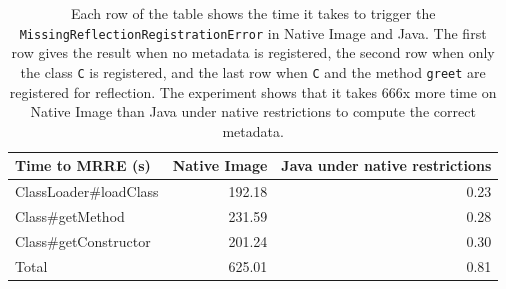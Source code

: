 \begin{table}[ht]
\centering
\begin{tabular}{@{}lrr@{}}
\toprule
Time to MRRE (s) & \multicolumn{1}{l}{Native Image} & \multicolumn{1}{l}{Java under native restrictions} \\ \midrule
ClassLoader\#loadClass          & 192.18 & 0.23 \\
Class\#getMethod                & 231.59 & 0.28 \\
Class\#getConstructor           & 201.24 & 0.30 \\ \midrule
Total                           & 625.01 & 0.81 \\ \bottomrule
\end{tabular}
\caption{Each row of the table shows the time it takes to trigger the \texttt{MissingReflectionRegistrationError} in Native Image and Java. The first row gives the result when no metadata is registered, the second row when only the class \texttt{C} is registered, and the last row when \texttt{C} and the method \texttt{greet} are registered for reflection. The experiment shows that it takes 666x more time on Native Image than Java under native restrictions to compute the correct metadata.}
\label{tab:benchmark}
\end{table}
